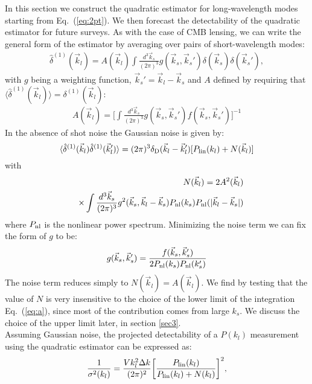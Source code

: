 \documentclass[prd,amsmath,amssymb,floatfix,superscriptaddress,nofootinbib,twocolumn]{revtex4-1}
\def\be{\begin{equation}}
\def\ee{\end{equation}}
\newcommand{\vs}{\nonumber\\}
\newcommand{\vk}{\vec{k}}
\newcommand{\ec}[1]{Eq.~(\ref{eq:#1})}
\newcommand{\eql}[1]{\label{eq:#1}}
\begin{document}
\label{sec2}
In this section we construct the quadratic estimator for long-wavelength modes starting from \ec{2pt}. We then forecast the detectability of the quadratic estimator for future surveys. As with the case of CMB lensing, we can write the general form of the estimator by averaging over pairs of short-wavelength modes:
\begin{eqnarray}
\hat{\delta}^{(1)}(\vec{k}_l)=A(\vec{k}_l)\int \frac{d^3 \vec{k}_s}{(2\pi)^3} g(\vec{k}_s,\vec{k}_s'){\delta}(\vec{k}_s){\delta}(\vec{k}_s') \eql{quadest},
\end{eqnarray} 
with $g$ being a weighting function, $\vk_s'=\vk_l-\vk_s$ and $A$  defined by requiring that $\langle \hat{\delta}^{(1)}(\vec{k}_l) \rangle={\delta}^{(1)}(\vec{k}_l)$:
\begin{eqnarray}
A(\vec{k}_l)=\bigg[\int \frac{d^3 \vec{k}_s}{(2\pi)^3} g(\vec{k}_s,\vec{k}_s')f(\vec{k}_s,\vec{k}_s')  \bigg]^{-1} \eql{a}
\end{eqnarray}
In the absence of shot noise the Gaussian noise is given by:
\be 
\langle \hat{\delta}^{(1)}(\vk_{l})\hat{\delta}^{(1)}(\vk_{l}') \rangle = (2\pi)^3 \delta_{\rm D}(\vk_{l}-\vk_{l}')[P_{\rm lin}(k_{l})+N(\vk_l)]
\ee 
with 
\begin{eqnarray}
&&N(\vec{k}_{l})=2A^2(\vk_{l})\vs
&&\times\int \frac{d^3 \vec{k}_{s}}{(2\pi)^3} g^2(\vec{k}_{s},\vk_l-\vec{k}_{s})P_{\rm nl}(k_{s})P_{\rm nl}(|\vk_l-\vk_s|)
\end{eqnarray}
where $P_{\rm nl}$ is the nonlinear power spectrum. Minimizing the noise term we can fix the form of $g$ to be:
\begin{eqnarray}
g(\vec{k}_{s},\vec{k}_{s}')=\frac{f(\vec{k}_{s},\vec{k}_{s}')}{2P_{\rm nl}(k_{s})P_{\rm nl}(k_{s}')}
\end{eqnarray} 
The noise term reduces simply to $N(\vk_l)=A(\vk_l)$. We find by testing that the value of $N$ is very insensitive to the choice of the lower limit of the integration \ec{a}, since most of the contribution comes from large $k_s$. We discuss the choice of the upper limit later, in section \ref{sec3}.\\
Assuming Gaussian noise, the projected detectability of a $P(k_l)$ measurement using the quadratic estimator can be expressed as:
\be
\frac{1}{\sigma^{2}(k_l)}=\frac{V k_l^2 \Delta k }{(2\pi)^2}\bigg[\frac{P_{\rm lin}(k_l)}{P_{\rm lin}(k_l)+N(k_l) }\bigg]^2 \eql{error},
\ee
\end{document}
